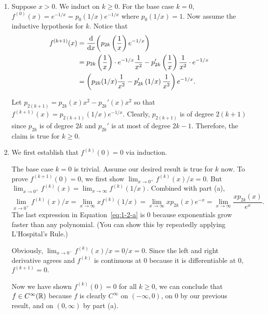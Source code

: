 \begin{enumerate}[label=(\alph*)]

    \item Suppose $x > 0$. We induct on $k \geq 0$. For the base case $k = 0$, $f^{(0)}(x) = e^{-1/x} = p_{0}(1/x) e^{-1/x}$ where 
    $p_0 (1/x) = 1$. Now assume the inductive hypothesis for $k$. Notice that 
    \begin{align}
        f^{(k+1)}(x) &= \dv{x}( p_{2k}\left(\frac{1}{x}\right) e^{-1/x} ) \\ 
        &=  p_{2k}\left( \frac{1}{x} \right) \cdot e^{-1/x} \frac{1}{x^2} - p_{2k}'\left(\frac{1}{x}\right) \frac{1}{x^2} \cdot e^{-1/x} \\
        &= \left( p_{2k}(1/x) \frac{1}{x^2} - p_{2k}'\left(1/x\right) \frac{1}{x^2} \right) e^{-1/x} .
    \end{align}

    Let $p_{2(k+1)} = p_{2k} (x) x^2 - p_{2k}'(x) x^2$ so that $f^{(k+1)}(x) = p_{2(k+1)}(1/x) e^{-1/x}$. 
    Clearly, $p_{2(k+1)}$ is of degree $2(k+1)$ since $p_{2k}$ is of 
    degree $2k$ and $p_{2k}'$ is at most of degree $2k - 1$.
    Therefore, the claim is true for $k \geq 0$.

    \item We first establish that $f^{(k)}(0) = 0$ via induction.
    
    The base case $k=0$ is trivial. Assume our desired result is true for $k$ now.
    To prove $f^{(k+1)}(0) = 0$, we first show $\lim_{x \to 0^+} f^{(k)}(x) / x = 0$. But 
    $\lim_{x \to 0^+} f^{(k)} (x) = \lim_{x \to \infty} f^{(k)} (1/x)$. Combined with part (a), 
    \begin{equation} \label{eq:1-2-a}
        \lim_{x \to 0^+} f^{(k)} (x) / x = \lim_{x \to \infty} x f^{(k)} (1/x) = \lim_{x \to \infty} xp_{2k}(x) e^{-x} = \lim_{x \to \infty} \frac{xp_{2k}(x)}{e^x}.
    \end{equation}
    The last expression in Equation~\ref{eq:1-2-a} is $0$ because exponentials grow faster than any polynomial. (You can show 
    this by repeatedly applying L'Hospital's Rule.) 

    Obviously, $\lim_{x \to 0^-} f^{(k)}(x) / x = 0 / x = 0$. Since the left and right derivative agrees and $f^{(k)}$ 
    is continuous at $0$ because it is differentiable at $0$, $f^{(k+1)} = 0$.

    Now we have shown $f^{(k)}(0) = 0$ for all $k \geq 0$, we can conclude that $f \in C^\infty(\mathbb{R})$ 
    because $f$ is clearly $C^\infty$ on $(-\infty, 0)$, on $0$ by our previous result, and on $(0, \infty)$ by part (a).

\end{enumerate}